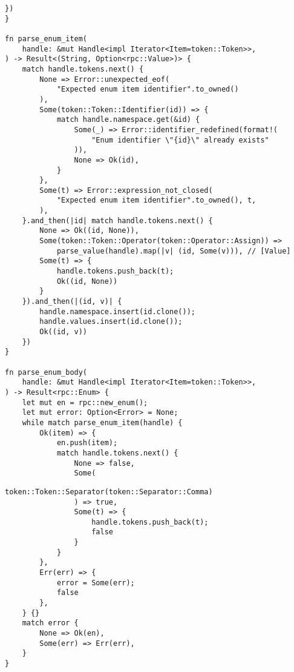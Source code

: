 \clearpage
\begin{lstlisting}[caption={Разбор enum (часть 2)}, label={lst:rust_parser_enum2}]
    })
}

fn parse_enum_item(
    handle: &mut Handle<impl Iterator<Item=token::Token>>,
) -> Result<(String, Option<rpc::Value>)> {
    match handle.tokens.next() {
        None => Error::unexpected_eof(
            "Expected enum item identifier".to_owned()
        ),
        Some(token::Token::Identifier(id)) => {
            match handle.namespace.get(&id) {
                Some(_) => Error::identifier_redefined(format!(
                    "Enum identifier \"{id}\" already exists"
                )),
                None => Ok(id),
            }
        },
        Some(t) => Error::expression_not_closed(
            "Expected enum item identifier".to_owned(), t,
        ),
    }.and_then(|id| match handle.tokens.next() {
        None => Ok((id, None)),
        Some(token::Token::Operator(token::Operator::Assign)) =>
            parse_value(handle).map(|v| (id, Some(v))), // [Value]
        Some(t) => {
            handle.tokens.push_back(t);
            Ok((id, None))
        }
    }).and_then(|(id, v)| {
        handle.namespace.insert(id.clone());
        handle.values.insert(id.clone());
        Ok((id, v))
    })
}

fn parse_enum_body(
    handle: &mut Handle<impl Iterator<Item=token::Token>>,
) -> Result<rpc::Enum> {
    let mut en = rpc::new_enum();
    let mut error: Option<Error> = None;
    while match parse_enum_item(handle) {
        Ok(item) => {
            en.push(item);
            match handle.tokens.next() {
                None => false,
                Some(
\end{lstlisting}
\clearpage
\begin{lstlisting}[caption={Разбор enum (часть 3)}, label={lst:rust_parser_enum3}]
                    token::Token::Separator(token::Separator::Comma)
                ) => true,
                Some(t) => {
                    handle.tokens.push_back(t);
                    false
                }
            }
        },
        Err(err) => {
            error = Some(err);
            false
        },
    } {}
    match error {
        None => Ok(en),
        Some(err) => Err(err),
    }
}
\end{lstlisting}


